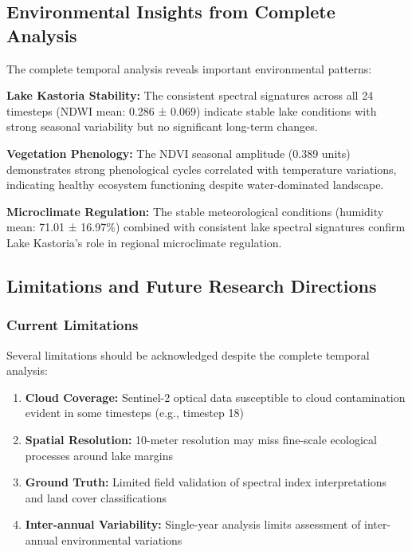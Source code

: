 \documentclass[a4paper,12pt]{article}
\begin{document}
\subsection{Environmental Insights from Complete Analysis}

The complete temporal analysis reveals important environmental patterns:

\textbf{Lake Kastoria Stability:} The consistent spectral signatures across all
24 timesteps (NDWI mean: 0.286 ± 0.069) indicate stable lake conditions with
strong seasonal variability but no significant long-term changes.

\textbf{Vegetation Phenology:} The NDVI seasonal amplitude (0.389 units) demonstrates
strong phenological cycles correlated with temperature variations, indicating
healthy ecosystem functioning despite water-dominated landscape.

\textbf{Microclimate Regulation:} The stable meteorological conditions (humidity
mean: 71.01 ± 16.97\%) combined with consistent lake spectral signatures confirm
Lake Kastoria's role in regional microclimate regulation.

\subsection{Limitations and Future Research Directions}

\subsubsection{Current Limitations}

Several limitations should be acknowledged despite the complete temporal analysis:

\begin{enumerate}
    \item \textbf{Cloud Coverage:} Sentinel-2 optical data susceptible to cloud
          contamination evident in some timesteps (e.g., timestep 18)
    \item \textbf{Spatial Resolution:} 10-meter resolution may miss fine-scale
          ecological processes around lake margins
    \item \textbf{Ground Truth:} Limited field validation of spectral index
          interpretations and land cover classifications
    \item \textbf{Inter-annual Variability:} Single-year analysis limits assessment
          of inter-annual environmental variations
\end{enumerate}
\end{document}
